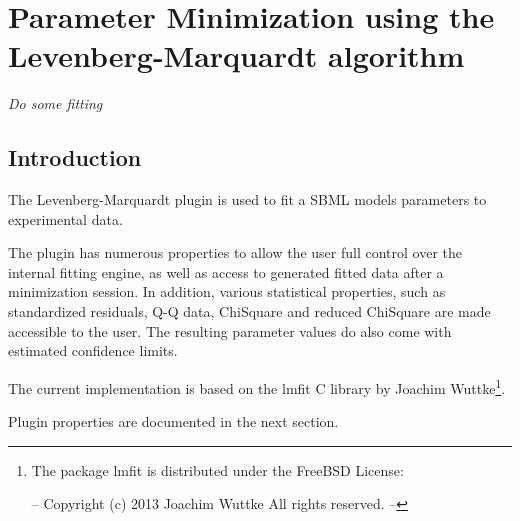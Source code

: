 \chapter*{Parameter Minimization using the Levenberg-Marquardt algorithm}
\setcounter{chapter}{1}
\emph{Do some fitting}
\section{Introduction}
The Levenberg-Marquardt plugin is used to fit a SBML models parameters to experimental data. 

The plugin has numerous properties to allow the user full control over the internal fitting engine, as well as 
access to generated fitted data after a minimization session. In addition, various statistical properties, such as standardized residuals, Q-Q data, ChiSquare and reduced ChiSquare are made accessible to the user. The resulting parameter values do also come with estimated confidence limits.

The current implementation is based on the lmfit C library by Joachim Wuttke\footnote{The package lmfit is distributed under the FreeBSD License:

--
  Copyright (c) 2013 Joachim Wuttke All rights reserved.
--}.


Plugin properties are documented in the next section.

